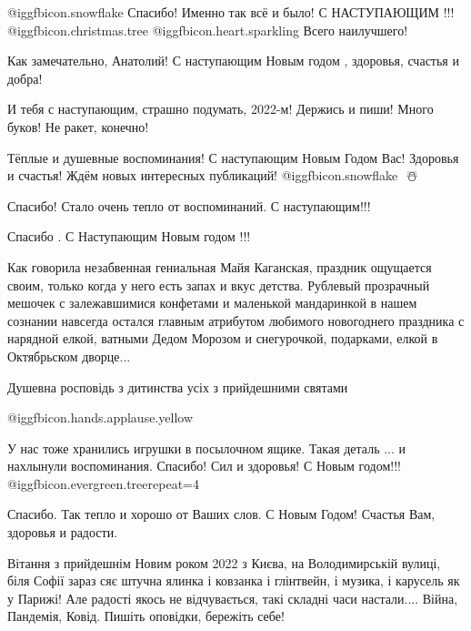 \begin{itemize}
\begin{itemize}
\end{itemize} %


@igg{fbicon.snowflake} Спасибо! Именно так всё и было! С НАСТУПАЮЩИМ !!!
@igg{fbicon.christmas.tree}  @igg{fbicon.heart.sparkling}  Всего наилучшего!

Как замечательно, Анатолий! С наступающим Новым годом , здоровья, счастья и добра!

И тебя с наступающим, страшно подумать, 2022-м! Держись и пиши! Много буков! Не ракет, конечно!


Тёплые и душевные воспоминания! С наступающим Новым Годом Вас! Здоровья и
счастья! Ждём новых интересных публикаций! @igg{fbicon.snowflake} ️ ☃️

Спасибо! Стало очень тепло от воспоминаний. С наступающим!!!

Спасибо . С Наступающим Новым годом !!!


Как говорила незабвенная гениальная Майя Каганская, праздник ощущается своим,
только когда у него есть запах и вкус детства. Рублевый прозрачный мешочек с
залежавшимися конфетами и маленькой мандаринкой в нашем сознании навсегда
остался главным атрибутом любимого новогоднего праздника с нарядной елкой,
ватными Дедом Морозом и снегурочкой, подарками, елкой в Октябрьском дворце...


Душевна росповідь з дитинства усіх з прийдешними святами


 @igg{fbicon.hands.applause.yellow} 


У нас тоже хранились игрушки в посылочном ящике. Такая деталь ... и нахлынули
воспоминания. Спасибо! Сил и здоровья! С Новым годом!!! @igg{fbicon.evergreen.tree}{repeat=4} 

Спасибо. Так тепло и хорошо от Ваших слов. С Новым Годом! Счастья Вам, здоровья и радости.


Вітання з прийдешнім Новим роком 2022 з Києва, на Володимирській вулиці, біля
Софії зараз сяє штучна ялинка і ковзанка і глінтвейн, і музика, і карусель як у
Парижі! Але радості якось не відчувається, такі складні часи настали.... Війна,
Пандемія, Ковід. Пишіть оповідки, бережіть себе!


\end{itemize}

